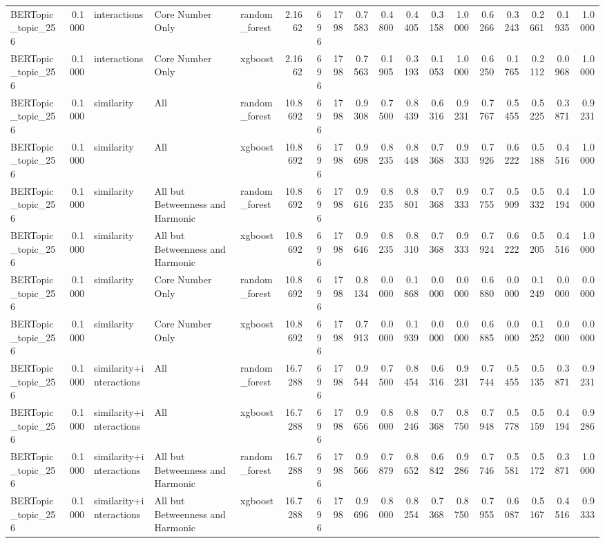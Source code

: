 \begin{tabular}{lrlllrrrrrrrrrrrrr}
BERTopic_topic_256 & 0.1000 & interactions & Core Number Only & random_forest & 2.1662 & 696 & 1798 & 0.7583 & 0.4800 & 0.4405 & 0.3158 & 1.0000 & 0.6266 & 0.3243 & 0.2661 & 0.1935 & 1.0000 \\
BERTopic_topic_256 & 0.1000 & interactions & Core Number Only & xgboost & 2.1662 & 696 & 1798 & 0.7563 & 0.1905 & 0.3193 & 0.1053 & 1.0000 & 0.6250 & 0.1765 & 0.2112 & 0.0968 & 1.0000 \\
BERTopic_topic_256 & 0.1000 & similarity & All & random_forest & 10.8692 & 696 & 1798 & 0.9308 & 0.7500 & 0.8439 & 0.6316 & 0.9231 & 0.7767 & 0.5455 & 0.5225 & 0.3871 & 0.9231 \\
BERTopic_topic_256 & 0.1000 & similarity & All & xgboost & 10.8692 & 696 & 1798 & 0.9698 & 0.8235 & 0.8448 & 0.7368 & 0.9333 & 0.7926 & 0.6222 & 0.5188 & 0.4516 & 1.0000 \\
BERTopic_topic_256 & 0.1000 & similarity & All but Betweenness and Harmonic & random_forest & 10.8692 & 696 & 1798 & 0.9616 & 0.8235 & 0.8801 & 0.7368 & 0.9333 & 0.7755 & 0.5909 & 0.5332 & 0.4194 & 1.0000 \\
BERTopic_topic_256 & 0.1000 & similarity & All but Betweenness and Harmonic & xgboost & 10.8692 & 696 & 1798 & 0.9646 & 0.8235 & 0.8310 & 0.7368 & 0.9333 & 0.7924 & 0.6222 & 0.5205 & 0.4516 & 1.0000 \\
BERTopic_topic_256 & 0.1000 & similarity & Core Number Only & random_forest & 10.8692 & 696 & 1798 & 0.8134 & 0.0000 & 0.1868 & 0.0000 & 0.0000 & 0.6880 & 0.0000 & 0.1249 & 0.0000 & 0.0000 \\
BERTopic_topic_256 & 0.1000 & similarity & Core Number Only & xgboost & 10.8692 & 696 & 1798 & 0.7913 & 0.0000 & 0.1939 & 0.0000 & 0.0000 & 0.6885 & 0.0000 & 0.1252 & 0.0000 & 0.0000 \\
BERTopic_topic_256 & 0.1000 & similarity+interactions & All & random_forest & 16.7288 & 696 & 1798 & 0.9544 & 0.7500 & 0.8454 & 0.6316 & 0.9231 & 0.7744 & 0.5455 & 0.5135 & 0.3871 & 0.9231 \\
BERTopic_topic_256 & 0.1000 & similarity+interactions & All & xgboost & 16.7288 & 696 & 1798 & 0.9656 & 0.8000 & 0.8246 & 0.7368 & 0.8750 & 0.7948 & 0.5778 & 0.5159 & 0.4194 & 0.9286 \\
BERTopic_topic_256 & 0.1000 & similarity+interactions & All but Betweenness and Harmonic & random_forest & 16.7288 & 696 & 1798 & 0.9566 & 0.7879 & 0.8652 & 0.6842 & 0.9286 & 0.7746 & 0.5581 & 0.5172 & 0.3871 & 1.0000 \\
BERTopic_topic_256 & 0.1000 & similarity+interactions & All but Betweenness and Harmonic & xgboost & 16.7288 & 696 & 1798 & 0.9696 & 0.8000 & 0.8254 & 0.7368 & 0.8750 & 0.7955 & 0.6087 & 0.5167 & 0.4516 & 0.9333 \\

\end{tabular}
